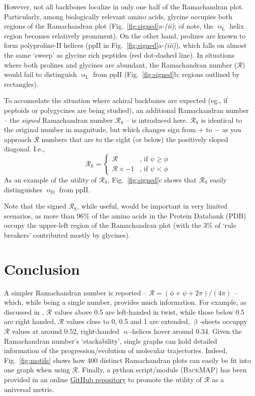 \documentclass[fleqn,10pt,lineno]{wlpeerj} %
\newcommand{\Fig}[1]{Fig.~\ref{#1}}
\newcommand{\n}[1]{{\color{red}#1}}
\newcommand{\gname}{BackMAP}
\newcommand{\pname}{\textsc{\gname}\xspace}
\newcommand{\rr}{$\mathcal{R}$\xspace}
\begin{document}
However, not all backbones localize in only one half of the Ramachandran plot. Particularly, among biologically relevant amino acids, glycine occupies both regions of the Ramachandran plot (\Fig{fig:signed}a-{\it(ii)}; of note, the $\upalpha_\textrm{L}$ helix region becomes relatively prominent). On the other hand, prolines are known to form polyproline-II helices ($\textrm{ppII}$ in \Fig{fig:signed}a-{\it(iii)}), which falls on almost the same `sweep' as glycine rich peptides (red dot-dashed line). In situations where both prolines and glycines are abundant, the Ramachandran number (\rr) would fail to distinguish $\upalpha_\textrm{L}$ from $\textrm{ppII}$ (\Fig{fig:signed}b; regions outlined by rectangles).


To accomodate the situation where achiral backbones are expected (eg., if peptoids or polygycines are being studied), an additional Ramachandran number -- the \textit{signed} Ramachandran number $\mathcal{R}_\textrm{S}$ -- is introduced here. $\mathcal{R}_\textrm{S}$ is identical to the original number in magnitude, but which changes sign from $+$ to $-$ as you approach $\mathcal{R}$ numbers that are to the right (or below) the positively sloped diagonal. I.e., 
\begin{equation}
\mathcal{R}_\textrm{S} = 
\begin{cases}
    \mathcal{R}         &\text{, if } \psi \geq \phi  \\
    \mathcal{R}\times-1 &\text{, if } \psi   <  \phi
\end{cases}\label{eqn:signed}
\end{equation}
As an example of the utility of $\mathcal{R}_\textrm{S}$, \Fig{fig:signed}c shows that $\mathcal{R}_\textrm{S}$ easily distinguishes $\upalpha_\textrm{D}$ from $\textrm{ppII}$.

Note that the signed $\mathcal{R}_\textrm{S}$, while useful, would be important in very limited scenarios, as more than 96\% of the amino acids in the Protein Databank (PDB) occupy the upper-left region of the Ramachandran plot (with the 3\% of `rule breakers' contributed mostly by glycines).

\section*{Conclusion}

A simpler Ramachandran number is reported -- $\mathcal{R} = (\phi+\psi+2\pi)/(4\pi)$ -- which, while being a single number, provides much information. For example, as discussed in \cite{Mannige2016}, \rr values above 0.5 are left-handed \n{in twist}, while those below 0.5 are right handed, \rr values close to 0, 0.5 and 1 are extended, $\upbeta$-sheets occuppy \rr values at around 0.52, right-handed $\upalpha$-helices hover around 0.34. Given the Ramachandran number's `stackability', single graphs can hold detailed information of the progression/evolution of molecular trajectories. Indeed, \Fig{fig:motifs} shows how 400 distinct Ramachandran plots can easily be fit into one graph when using \rr. Finally, a python script/module (\pname) has been provided in an online \href{https://github.com/ranjanmannige/\gname}{GitHub repository} to promote the utility of \rr as a universal metric.
\end{document}
